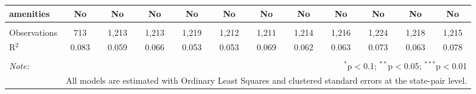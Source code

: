 \begin{table}[!htbp]
\begin{tabular}{@{\extracolsep{5pt}}lccccccccccc}
amenities & No & No & No & No & No & No & No & No & No & No & No \\ 
\hline \\[-1.8ex] 
Observations & 713 & 1,213 & 1,213 & 1,219 & 1,212 & 1,211 & 1,214 & 1,216 & 1,224 & 1,218 & 1,215 \\ 
R$^{2}$ & 0.083 & 0.059 & 0.066 & 0.053 & 0.053 & 0.069 & 0.062 & 0.063 & 0.073 & 0.063 & 0.078 \\ 
\hline 
\hline \\[-1.8ex] 
\textit{Note:}  & \multicolumn{11}{r}{$^{*}$p$<$0.1; $^{**}$p$<$0.05; $^{***}$p$<$0.01} \\ 
 & \multicolumn{11}{r}{All models are estimated with Ordinary Least Squares and clustered standard errors at the state-pair level.} \\ 
\end{tabular} 
\end{table} 
